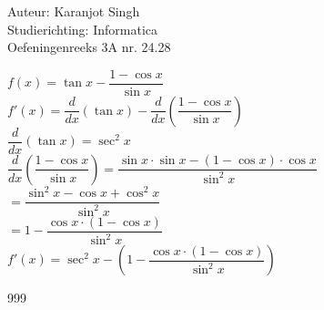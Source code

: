 \documentclass[a4paper]{article}
\begin{document}
	
\noindent \large Auteur: Karanjot Singh \\
\noindent \large Studierichting: Informatica \\
\noindent \large Oefeningenreeks 3A nr. 24.28 \\

\normalsize

$f(x) = \tan x - \dfrac{1 - \cos x}{\sin x}$\\

$f'(x) = \dfrac{d}{dx} (\tan x) - \dfrac{d}{dx} \left( \dfrac{1 - \cos x}{\sin x} \right)$\\

$\dfrac{d}{dx} (\tan x) = \sec^2 x$\\

$\dfrac{d}{dx} \left( \dfrac{1 - \cos x}{\sin x} \right) = \dfrac{\sin x \cdot \sin x - (1 - \cos x) \cdot \cos x}{\sin^2 x}$\\

$= \dfrac{\sin^2 x - \cos x + \cos^2 x}{\sin^2 x}$\\

$= 1 - \dfrac{\cos x \cdot (1 - \cos x)}{\sin^2 x}$\\

$f'(x) = \sec^2 x - \left(1 - \dfrac{\cos x \cdot (1 - \cos x)}{\sin^2 x}\right)$\\

\begin{thebibliography}{999}
\end{thebibliography}
\end{document}

